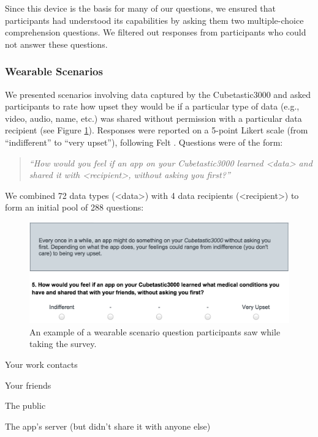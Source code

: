 Since this device is the basis for many of our questions, we ensured that participants had understood its capabilities by asking them two multiple-choice comprehension questions. We filtered out responses from participants who could not answer these questions.

\subsubsection{Wearable Scenarios}
We presented scenarios involving data captured by the Cubetastic3000 and asked participants to rate how upset they would be if a particular type of data (e.g., video, audio, name, etc.) was shared without permission with a particular data recipient (see Figure \ref{fig:prompt}). Responses were reported on a 5-point Likert scale (from ``indifferent'' to ``very upset''), following Felt \etal\cite{Felt}. Questions were of the form: 

\begin{quotation}
\noindent
\textit{``How would you feel if an app on your Cubetastic3000 learned <data> and shared it with <recipient>, without asking you first?''}
\end{quotation}

We combined 72 data types (<data>) with 4 data recipients (<recipient>) to form an initial pool of 288 questions: %

\begin{figure}[t]
	\centering
	\includegraphics[width=\columnwidth]{images/prompt.pdf}
	\caption{An example of a wearable scenario question participants saw while taking the survey.}
	\label{fig:prompt}
\end{figure}

\begin{packed_item}
\item Your work contacts
\item Your friends
\item The public
\item The app's server (but didn't share it with anyone else) %
\end{packed_item}

